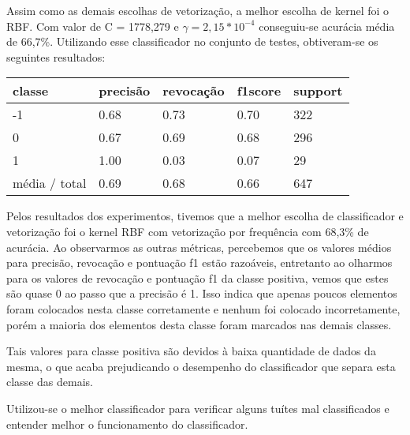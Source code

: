Assim como as demais escolhas de vetorização, a melhor escolha de kernel foi o RBF.
Com valor de C = 1778,279 e $\gamma = 2,15*10^{-4}$ conseguiu-se acurácia média de 66,7\%.
Utilizando esse classificador no conjunto de testes, obtiveram-se os seguintes resultados:

\begin{table}[H]
	\centering
	\begin{tabular}{l | l | l | l | l}
		\hline
		classe  	&	precisão  &  revocação &  f1\-score &  support \\
		\hline
         -1   &    0.68  &    0.73   &   0.70   &    322 \\
         \hline
          0   &    0.67   &   0.69   &   0.68    &   296 \\
          \hline
          1   &    1.00   &   0.03   &   0.07    &    29 \\
		\hline
		média / total   &    0.69   &   0.68   &   0.66   &    647 \\
		\hline
	\end{tabular}
\end{table} 

Pelos resultados dos experimentos, tivemos que a melhor escolha de classificador e vetorização
foi o kernel RBF com vetorização por frequência com 68,3\% de acurácia. Ao observarmos as outras
métricas, percebemos que os valores médios para precisão, revocação e pontuação f1 estão razoáveis,
entretanto ao olharmos para os valores de revocação e pontuação f1 da classe positiva, vemos
que estes são quase 0 ao passo que a precisão é 1. Isso indica que apenas poucos elementos foram
colocados nesta classe corretamente e nenhum foi colocado incorretamente, porém a maioria dos
elementos desta classe foram marcados nas demais classes.

Tais valores para classe positiva são devidos à baixa quantidade de dados da mesma, o que acaba
prejudicando o desempenho do classificador que separa esta classe das demais.

Utilizou-se o melhor classificador para verificar alguns tuítes mal classificados e entender melhor
o funcionamento do classificador.

